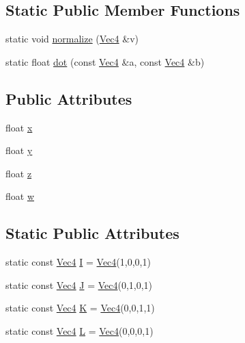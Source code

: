 \subsection*{Static Public Member Functions}
\begin{DoxyCompactItemize}
\item 
static void \hyperlink{class_vec4_a64d1e990b78435916d67ff2126da8290}{normalize} (\hyperlink{class_vec4}{Vec4} \&v)
\item 
static float \hyperlink{class_vec4_a82aab4614e4da9146cd496c8e2eaa3e8}{dot} (const \hyperlink{class_vec4}{Vec4} \&a, const \hyperlink{class_vec4}{Vec4} \&b)
\end{DoxyCompactItemize}
\subsection*{Public Attributes}
\begin{DoxyCompactItemize}
\item 
float \hyperlink{class_vec4_a3d9a7d18ac661965798b0c5bc32c56df}{x}
\item 
float \hyperlink{class_vec4_a21c69aa0ef01a4ea985966c5527bbd69}{y}
\item 
float \hyperlink{class_vec4_a60d0b599c7104dd0c6e2ae0cc4cd0310}{z}
\item 
float \hyperlink{class_vec4_a37bee38ceffb78ccd3875ebf82bd84b2}{w}
\end{DoxyCompactItemize}
\subsection*{Static Public Attributes}
\begin{DoxyCompactItemize}
\item 
static const \hyperlink{class_vec4}{Vec4} \hyperlink{class_vec4_a2fb368b5a9801a6a7f1625f854df72a9}{I} = \hyperlink{class_vec4}{Vec4}(1,0,0,1)
\item 
static const \hyperlink{class_vec4}{Vec4} \hyperlink{class_vec4_a36d69a7a47b6626887e25d92bd02fa96}{J} = \hyperlink{class_vec4}{Vec4}(0,1,0,1)
\item 
static const \hyperlink{class_vec4}{Vec4} \hyperlink{class_vec4_addeaf426d9bc1652437910579bac60a7}{K} = \hyperlink{class_vec4}{Vec4}(0,0,1,1)
\item 
static const \hyperlink{class_vec4}{Vec4} \hyperlink{class_vec4_a448e9112941328b5eac24ca623e97295}{L} = \hyperlink{class_vec4}{Vec4}(0,0,0,1)
\end{DoxyCompactItemize}


